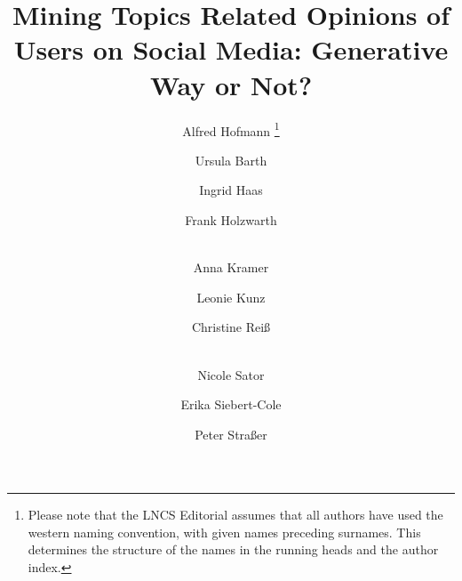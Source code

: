 \documentclass[runningheads,a4paper]{llncs}
\begin{document}
\mainmatter  %

\title{Mining Topics Related Opinions of Users on Social Media: Generative Way or Not?}


%
%
\author{Alfred Hofmann%
\thanks{Please note that the LNCS Editorial assumes that all authors have used
the western naming convention, with given names preceding surnames. This determines
the structure of the names in the running heads and the author index.}%
\and Ursula Barth\and Ingrid Haas\and Frank Holzwarth\and\\
Anna Kramer\and Leonie Kunz\and Christine Rei\ss\and\\
Nicole Sator\and Erika Siebert-Cole\and Peter Stra\ss er}
%


%
%

\maketitle
\end{document}
